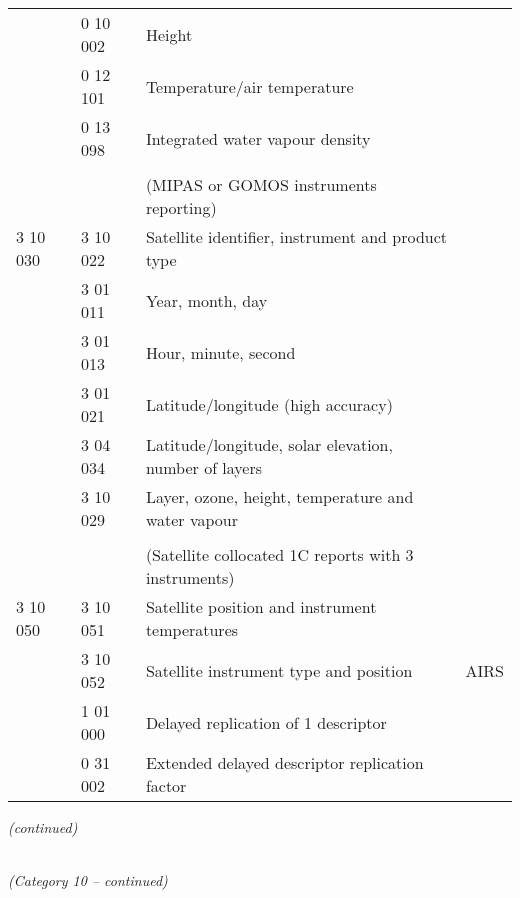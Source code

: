 \begin{longtable}[]{@{}llll@{}}
& 0 10 002 & Height &\tabularnewline
& 0 12 101 & Temperature/air temperature &\tabularnewline
& 0 13 098 & Integrated water vapour density &\tabularnewline
& & &\tabularnewline
& & (MIPAS or GOMOS instruments reporting) &\tabularnewline
3 10 030 & 3 10 022 & Satellite identifier, instrument and product type &\tabularnewline
& 3 01 011 & Year, month, day &\tabularnewline
& 3 01 013 & Hour, minute, second &\tabularnewline
& 3 01 021 & Latitude/longitude (high accuracy) &\tabularnewline
& 3 04 034 & Latitude/longitude, solar elevation, number of layers &\tabularnewline
& 3 10 029 & Layer, ozone, height, temperature and water vapour &\tabularnewline
& & &\tabularnewline
& & (Satellite collocated 1C reports with 3 instruments) &\tabularnewline
3 10 050 & 3 10 051 & Satellite position and instrument temperatures &\tabularnewline
& 3 10 052 & Satellite instrument type and position & AIRS\tabularnewline
& 1 01 000 & Delayed replication of 1 descriptor &\tabularnewline
& 0 31 002 & Extended delayed descriptor replication factor &\tabularnewline
\bottomrule
\end{longtable}

\emph{(continued)}

\emph{\\
(Category 10 -- continued)}

